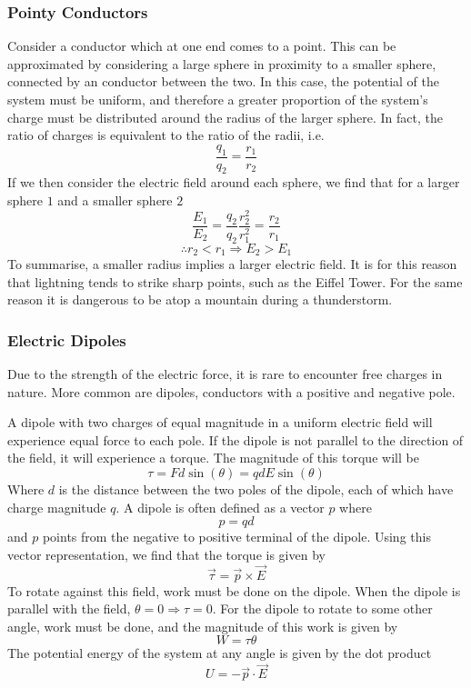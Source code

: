 \documentclass[12pt]{report}
\begin{document}
\begin{flushleft}
\subsubsection*{Pointy Conductors}

Consider a conductor which at one end comes to a point. This can be 
approximated by considering a large sphere in proximity to a smaller sphere,
connected by an conductor between the two. In this case, the potential of the
system must be uniform, and therefore a greater proportion of the system's 
charge must be distributed around the radius of the larger sphere. In fact,
the ratio of charges is equivalent to the ratio of the radii, i.e.
\[\frac{q_1}{q_2} = \frac{r_1}{r_2}\]
If we then consider the electric field around each sphere, we find that for
a larger sphere \(1\) and a smaller sphere \(2\)
\[\frac{E_1}{E_2} = \frac{q_2}{q_2}\frac{r_2^2}{r_1^2} = \frac{r_2}{r_1}\]
\[\therefore r_2 < r_1 \Rightarrow E_2 > E_1\]
To summarise, a smaller radius implies a larger electric field. It is for this
reason that lightning tends to strike sharp points, such as the Eiffel Tower.
For the same reason it is dangerous to be atop a mountain during a 
thunderstorm.

\subsubsection*{Electric Dipoles}

Due to the strength of the electric force, it is rare to encounter free charges
in nature. More common are dipoles, conductors with a positive and negative 
pole. \par
A dipole with two charges of equal magnitude in a uniform electric field will
experience equal force to each pole. If the dipole is not parallel to the
direction of the field, it will experience a torque. The magnitude of this
torque will be
\[\tau = Fd\sin(\theta) = qdE\sin(\theta)\]
Where \(d\) is the distance between the two poles of the dipole, each of which
have charge magnitude \(q\). A dipole is often defined as a vector \(p\) where
\[p = qd\]
and \(p\) points from the negative to positive terminal of the dipole. Using
this vector representation, we find that the torque is given by
\[\vec{\tau} = \vec{p} \times \vec{E}\]
To rotate against this field, work must be done on the dipole. When the dipole
is parallel with the field, \(\theta = 0 \Rightarrow \tau = 0\). For the dipole
to rotate to some other angle, work must be done, and the magnitude of this 
work is given by
\[W = \tau\theta\]
The potential energy of the system at any angle is given by the dot product
\[U = -\vec{p} \cdot \vec{E}\]


\end{flushleft}
\end{document}
